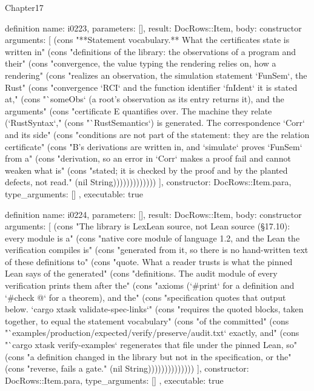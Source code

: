 \begin{lexlean}{Chapter17}
\begin{semanticmodule}
definition{
  name: i0223,
  parameters: [],
  result: DocRows::Item,
  body: constructor{
    arguments: [
      (cons "**Statement vocabulary.** What the certificates state is written in" (cons "definitions of the library: the observations of a program and their" (cons "convergence, the value typing the rendering relies on, how a rendering" (cons "realizes an observation, the simulation statement `FunSem`, the Rust" (cons "convergence `RCI` and the function identifier `fnIdent` it is stated at," (cons "`someObs` (a root's observation as its entry returns it), and the arguments" (cons "certificate E quantifies over. The machine they relate (`RustSyntax`," (cons "`RustSemantics`) is generated. The correspondence `Corr` and its side" (cons "conditions are not part of the statement: they are the relation certificate" (cons "B's derivations are written in, and `simulate` proves `FunSem` from a" (cons "derivation, so an error in `Corr` makes a proof fail and cannot weaken what is" (cons "stated; it is checked by the proof and by the planted defects, not read." (nil String)))))))))))))
    ],
    constructor: DocRows::Item.para,
    type_arguments: []
  },
  executable: true
}

definition{
  name: i0224,
  parameters: [],
  result: DocRows::Item,
  body: constructor{
    arguments: [
      (cons "The library is LexLean source, not Lean source (§17.10): every module is a" (cons "native core module of language 1.2, and the Lean the verification compiles is" (cons "generated from it, so there is no hand-written text of these definitions to" (cons "quote. What a reader trusts is what the pinned Lean says of the generated" (cons "definitions. The audit module of every verification prints them after the" (cons "axioms (`#print` for a definition and `#check @` for a theorem), and the" (cons "specification quotes that output below. `cargo xtask validate-spec-links`" (cons "requires the quoted blocks, taken together, to equal the statement vocabulary" (cons "of the committed" (cons "`examples/production/expected/verify/preserve/audit.txt` exactly, and" (cons "`cargo xtask verify-examples` regenerates that file under the pinned Lean, so" (cons "a definition changed in the library but not in the specification, or the" (cons "reverse, fails a gate." (nil String))))))))))))))
    ],
    constructor: DocRows::Item.para,
    type_arguments: []
  },
  executable: true
}


\end{semanticmodule}
\end{lexlean}
